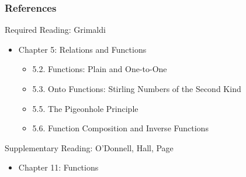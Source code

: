 \documentclass[dvipsnames]{beamer}
\begin{document}
\begin{frame}
  \frametitle{References}

  \begin{block}{Required Reading: Grimaldi}
    \begin{itemize}
      \item Chapter 5: Relations and Functions
      \begin{itemize}
        \item 5.2. \alert{Functions: Plain and One-to-One}
        \item 5.3. \alert{Onto Functions: Stirling Numbers of the Second Kind}
        \item 5.5. \alert{The Pigeonhole Principle}
        \item 5.6. \alert{Function Composition and Inverse Functions}
      \end{itemize}
    \end{itemize}
  \end{block}

  \begin{block}{Supplementary Reading: O'Donnell, Hall, Page}
    \begin{itemize}
      \item Chapter 11: Functions
    \end{itemize}
  \end{block}
\end{frame}
\end{document}
